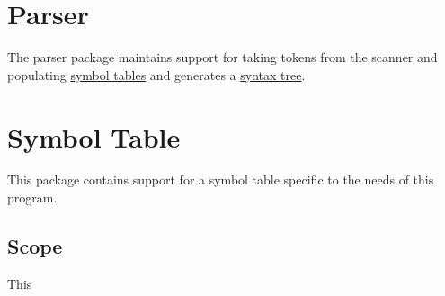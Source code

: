 \documentclass{article}
\begin{document}
\section{Parser} \label{parser}
The parser package maintains support for taking tokens from the scanner and populating \hyperref[symboltable]{symbol tables} and generates a \hyperref[syntaxtree]{syntax tree}.

\section{Symbol Table} \label{symboltable}
This package contains support for a symbol table specific to the needs of this program.

\subsection{Scope}
This 
\end{document}
